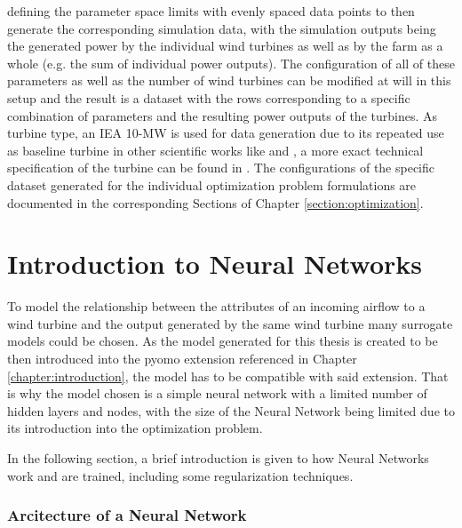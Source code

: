  defining the parameter space limits with evenly spaced data points to then generate the corresponding simulation data, with the simulation outputs being the generated power by the individual wind turbines as well as by the farm as a whole (e.g. the sum of individual power outputs). The configuration of all of these parameters as well as the number of wind turbines can be modified at will in this setup and the result is a dataset with the rows corresponding to a specific combination of parameters and the resulting power outputs of the turbines. As turbine type, an IEA 10-MW is used for data generation due to its repeated use as baseline turbine in other scientific works like \cite{Madsen2022} and \cite{Kainz2024IEA}, a more exact technical specification of the turbine can be found in \cite{Bortolotti2019}. The configurations of the specific dataset generated for the individual optimization problem formulations are documented in the corresponding Sections of Chapter \ref{section:optimization}.


\section{Introduction to Neural Networks} \label{sec:modelling}

To model the relationship between the attributes of an incoming airflow to a wind turbine and the output generated by the same wind turbine many surrogate models could be chosen. As the model generated for this thesis is created to be then introduced into the pyomo extension referenced in Chapter \ref{chapter:introduction}, the model has to be compatible with said extension. That is why the model chosen is a simple neural network with a limited number of hidden layers and nodes, with the size of the Neural Network being limited due to its introduction into the optimization problem. 

In the following section, a brief introduction is given to how Neural Networks work and are trained, including some regularization techniques.

\subsubsection{Arcitecture of a Neural Network}


